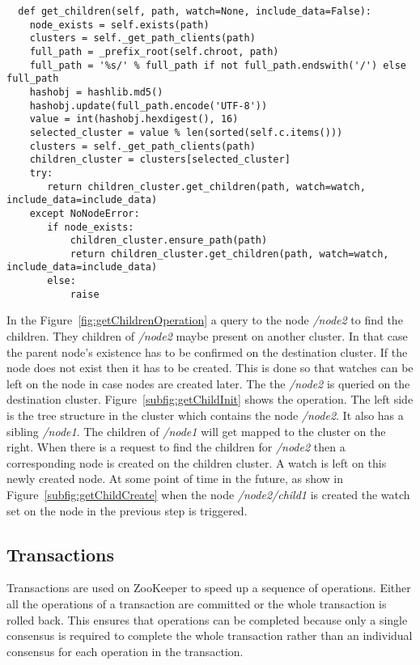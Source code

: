 \begin{lstlisting}
  def get_children(self, path, watch=None, include_data=False):
    node_exists = self.exists(path)
    clusters = self._get_path_clients(path)
    full_path = _prefix_root(self.chroot, path)
    full_path = '%s/' % full_path if not full_path.endswith('/') else full_path
    hashobj = hashlib.md5()
    hashobj.update(full_path.encode('UTF-8'))
    value = int(hashobj.hexdigest(), 16)
    selected_cluster = value % len(sorted(self.c.items()))
    clusters = self._get_path_clients(path)
    children_cluster = clusters[selected_cluster]
    try:
       return children_cluster.get_children(path, watch=watch, include_data=include_data)
    except NoNodeError:
       if node_exists:
           children_cluster.ensure_path(path)
           return children_cluster.get_children(path, watch=watch, include_data=include_data)
       else:
           raise
\end{lstlisting}



In the Figure~\ref{fig:getChildrenOperation} a query to the node \textit{/node2} to find the children. They children of \textit{/node2} maybe present on another cluster. In that case the parent node's existence has to be confirmed on the destination cluster. If the node does not exist then it has to be created. This is done so that watches can be left on the node in case nodes are created later. The the \textit{/node2} is queried on the destination cluster. Figure~\ref{subfig:getChildInit} shows the operation. The left side is the tree structure in the cluster which contains the node \textit{/node2}. It also has a sibling \textit{/node1}. The children of \textit{/node1} will get mapped to the cluster on the right. When there is a request to find the children for \textit{/node2} then a corresponding node is created on the children cluster. A watch is left on this newly created node. At some point of time in the future, as show in Figure~\ref{subfig:getChildCreate} when the node \textit{/node2/child1} is created the watch set on the node in the previous step is triggered.

\subsection{Transactions}
Transactions are used on ZooKeeper to speed up a sequence of operations. Either all the operations of a transaction are committed or the whole transaction is rolled back. This ensures that operations can be completed because only a single consensus is required to complete the whole transaction rather than an individual consensus for each operation in the transaction.
    

